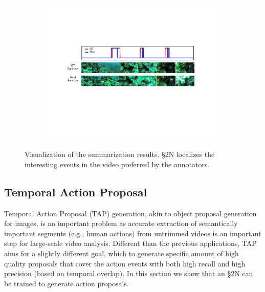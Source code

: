 \documentclass[10pt,journal,compsoc]{IEEEtran}
\begin{document}
\begin{figure}[t]
\centering
   \begin{subfigure}[b]{\textwidth}
   	\includegraphics[width=\textwidth]{figures/vis_scub_v2.pdf}
   \end{subfigure} 
   \caption{ Visualization of the summarization results. \S2N localizes the interesting events in the video preferred by the annotators. \label{fig:vis_vs}}   
\vspace{-.05in}
\end{figure}



\subsection{Temporal Action Proposal\label{sec:exp_THUMOS}}
Temporal Action Proposal (TAP) generation, akin to object proposal generation for images, is an important problem as accurate extraction of semantically important segments (e.g., human actions) from untrimmed videos is an important step for large-scale video analysis. Different than the previous applications, TAP aims for a slightly different goal, which to generate specific amount of high quality proposals that cover the action events with both high recall and high precision (based on temporal overlap). In this section we show that an \S2N can be trained to generate action proposals.
\end{document}
